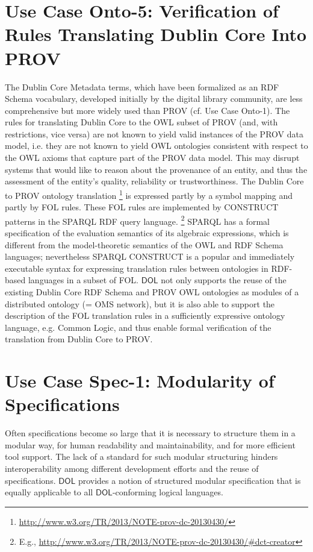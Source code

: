 \documentclass[10pt,fleqn,final]{scrreprt}
\newcommand*{\DOL}{\ensuremath{\mathsf{DOL}}\xspace}
\newenvironment{definitions}[0]{\medskip }{}
\begin{document}
\begin{definitions}
\section{Use Case Onto-5: Verification of Rules Translating Dublin Core Into PROV}
The Dublin Core Metadata terms, which have been formalized as an RDF Schema vocabulary, developed initially by the digital library community, are less 
comprehensive but more widely used than PROV (cf. Use Case Onto-1). The rules for translating Dublin Core to the OWL subset of PROV (and, with restrictions, 
vice versa) are not known to yield valid instances of the PROV data model, i.e. they are not known to yield OWL ontologies consistent with respect to the OWL axioms that 
capture part of the PROV data model. This may disrupt systems that would like to reason about the provenance of an entity, and thus the assessment of the 
entity's quality, reliability or trustworthiness.
The Dublin Core to PROV ontology translation%
\footnote{\url{http://www.w3.org/TR/2013/NOTE-prov-dc-20130430/}}
  is expressed partly by a symbol mapping and partly by FOL rules. These FOL rules are implemented by CONSTRUCT patterns in the SPARQL RDF query language.%
\footnote{E.g., \url{http://www.w3.org/TR/2013/NOTE-prov-dc-20130430/\#dct-creator}} 
SPARQL has a formal specification of the evaluation semantics of its algebraic expressions, which is different from the model-theoretic semantics of the OWL and RDF Schema languages; nevertheless SPARQL CONSTRUCT is a popular and immediately executable syntax for expressing translation rules between ontologies in RDF-based languages in a subset of FOL.
\DOL  not only supports the reuse of the existing Dublin Core RDF Schema and PROV OWL ontologies as modules of a distributed ontology (= OMS network), but it is also able to support the description of the FOL translation rules in a sufficiently expressive ontology language, e.g. Common Logic, and thus enable formal verification of the translation from Dublin Core to PROV.


\section{Use Case Spec-1: Modularity of Specifications}\label{spec-1}
Often specifications become so large that it is necessary to structure
them in a modular way, for human readability and maintainability, and for more efficient tool support. The lack of a standard for such
modular structuring hinders interoperability among different
development efforts and the reuse of specifications.  \DOL provides a
notion of structured modular specification that is equally applicable
to all \DOL-conforming logical languages.


\end{definitions}
\end{document}
